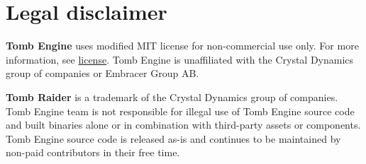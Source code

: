 \chapter*{Legal disclaimer}
\textbf{Tomb Engine} uses modified MIT license for non-commercial use only. For more information, see \href{https://github.com/TombEngine/TombEngine?tab=License-1-ov-file#readmeense}{license}. Tomb Engine is unaffiliated with the Crystal Dynamics group of companies or Embracer Group AB.
\par \textbf{Tomb Raider} is a trademark of the Crystal Dynamics group of companies. Tomb Engine team is not responsible for illegal use of Tomb Engine source code and built binaries alone or in combination with third-party assets or components. Tomb Engine source code is released as-is and continues to be maintained by non-paid contributors in their free time.